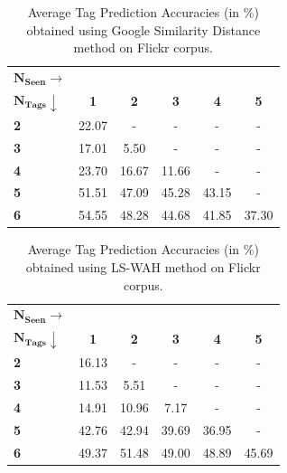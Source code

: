\begin{table}
\fontsize{8pt}{1em}\selectfont
\begin{center}
\caption{Average Tag Prediction Accuracies (in \%) obtained using Google Similarity Distance method on Flickr corpus.} 
\label{tab:TPFlickr117Google}
\begin{tabular}{|p{2cm}|c|c|c|c|c|}
		\hline
		{$\boldsymbol{N_{Seen} \rightarrow}$} & &  &  &  &\\ 
		{$\boldsymbol{ N_{Tags}} \downarrow$} & \textbf{1} & \textbf{2} & \textbf{3} & \textbf{4} & \textbf{5}   \\ 	
		\hline
		\textbf{2} & 22.07 & - & - & - & -\\ 
		\hline
		\textbf{3} & 17.01 & 5.50 & - & - & -\\ 
		\hline
		\textbf{4} & 23.70 & 16.67 & 11.66 & - & -\\ 
		\hline
		\textbf{5} & 51.51 & 47.09 & 45.28 & 43.15 & -\\ 
		\hline
		\textbf{6} & 54.55 & 48.28 & 44.68 & 41.85 & 37.30 \\ 
		\hline
\end{tabular}
\vspace{-2mm}
\end{center}
\end{table}
\begin{table}[!htb]
\fontsize{8pt}{1em}\selectfont
\begin{center}
\caption{Average Tag Prediction Accuracies (in \%) obtained using LS-WAH method on Flickr corpus.} 
\label{tab:TPFlickr117LSWAH}
\begin{tabular}{|p{2cm}|c|c|c|c|c|}
		\hline
		{$\boldsymbol{N_{Seen} \rightarrow}$} & &  &  &  &\\ 
		{$\boldsymbol{ N_{Tags}} \downarrow$} & \textbf{1} & \textbf{2} & \textbf{3} & \textbf{4} & \textbf{5}   \\ 	
		\hline
		\textbf{2} & 16.13 & - & - & - & -\\ 
		\hline
		\textbf{3} & 11.53 & 5.51 & - & - & -\\ 
		\hline
		\textbf{4} & 14.91 & 10.96 & 7.17 & - & -\\ 
		\hline
		\textbf{5} & 42.76 & 42.94 & 39.69 & 36.95 & -\\ 
		\hline
		\textbf{6} & 49.37 & 51.48 & 49.00 & 48.89 & 45.69 \\ 
		\hline
\end{tabular}
\vspace{-2mm}
\end{center}
\end{table}
